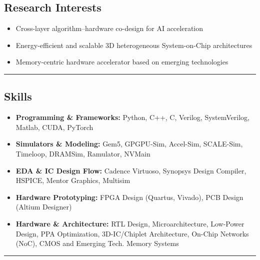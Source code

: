 \documentclass[10.5pt,letterpaper]{article}
\begin{document}
\subsection*{\Large Research Interests}

\begin{itemize}[leftmargin=1em, noitemsep,label={}]
    \item Cross-layer algorithm–hardware co-design for AI acceleration 
    \item Energy-efficient and scalable 3D heterogeneous System-on-Chip architectures
    \item Memory-centric hardware accelerator based on emerging technologies
\end{itemize}
\hrule
\vspace{-1em}
\subsection*{\Large Skills}
\begin{itemize}[leftmargin=1em, noitemsep,label={}]
    \item 
    \textbf{Programming \& Frameworks:} Python, C++, C, Verilog, SystemVerilog, Matlab, CUDA, PyTorch
    \item 
    \textbf{Simulators \& Modeling:} Gem5, GPGPU-Sim, Accel-Sim, SCALE-Sim, Timeloop, DRAMSim, Ramulator, NVMain
    \item 
    \textbf{EDA \& IC Design Flow:} Cadence Virtuoso, Synopsys Design Compiler, HSPICE, Mentor Graphics, Multisim
    \item 
    \textbf{Hardware Prototyping:} FPGA Design (Quartus, Vivado), PCB Design (Altium Designer)
    \item
    \textbf{Hardware \& Architecture:} RTL Design, Microarchitecture, Low-Power Design, PPA Optimization, 3D-IC/Chiplet Architecture, On-Chip Networks (NoC), CMOS and Emerging Tech. Memory Systems
\end{itemize}
\hrule
\vspace{-1em}
\end{document}

